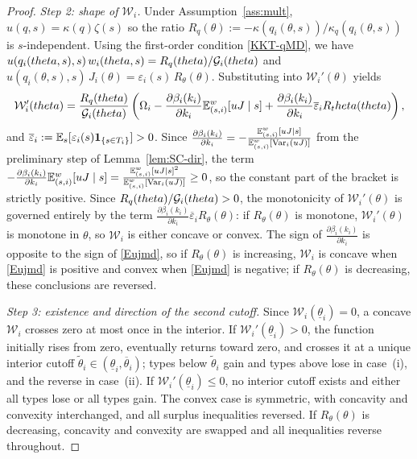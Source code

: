 \documentclass[master.tex]{subfiles}
\begin{document}
\begin{proof}
\noindent\textit{Step 2: shape of $\mathcal W_i$.} Under Assumption~\ref{ass:mult}, $u(q,s)=\kappa(q)\zeta(s)$ so the ratio $R_q(\theta) := -\kappa(q_i(\theta,s))/\kappa_q(q_i(\theta,s))$ is $s$-independent. Using the first-order condition \eqref{KKT-qMD}, we have $u(q_i(theta,s),s)\,w_i(theta,s) = R_q(theta)/\mathcal{G}_i(theta)$ and $u(q_i(\theta,s),s)\,J_i(\theta) = \varepsilon_i(s)\,R_\theta(\theta)$. Substituting into $\mathcal W_i'(\theta)$ yields
\[\mathcal W_i'(theta) = \frac{R_q(theta)}{\mathcal{G}_i(theta)}\left(\Omega_i - \frac{\partial \beta_i(k_i)}{\partial k_i}\mathbb{E}_{(s,i)}^w[uJ\mid s] + \frac{\partial \beta_i(k_i)}{\partial k_i} \overline \varepsilon_i R_theta(theta)\right),\]
and $ \overline \varepsilon_i := \mathbb{E}_s[\varepsilon_i(s)\mathbf 1_{\{s\in T_i\}}]>0$. Since $\frac{\partial \beta_i(k_i)}{\partial k_i} = -\frac{\mathbb{E}_{(s,i)}^w[uJ\mid s]}{\mathbb{E}_{(s,i)}^w[\mathrm{Var}_i(uJ)]}$ from the preliminary step of Lemma~\ref{lem:SC-dir}, the term $-\frac{\partial \beta_i(k_i)}{\partial k_i}\mathbb{E}_{(s,i)}^w[uJ\mid s] = \frac{\mathbb{E}_{(s,i)}^w[uJ\mid s]^2}{\mathbb{E}_{(s,i)}^w[\mathrm{Var}_i(uJ)]}\ge 0$, so the constant part of the bracket is strictly positive. Since $R_q(theta)/\mathcal{G}_i(theta)>0$, the monotonicity of $\mathcal W_i'(\theta)$ is governed entirely by the term $\frac{\partial \beta_i(k_i)}{\partial k_i} \overline \varepsilon_i R_\theta(\theta)$: if $R_\theta(\theta)$ is monotone, $\mathcal W_i'(\theta)$ is monotone in $\theta$, so $\mathcal W_i$ is either concave or convex. The sign of $\frac{\partial \beta_i(k_i)}{\partial k_i}$ is opposite to the sign of \eqref{Eujmd}, so if $R_\theta(\theta)$ is increasing, $\mathcal W_i$ is concave when \eqref{Eujmd} is positive and convex when \eqref{Eujmd} is negative; if $R_\theta(\theta)$ is decreasing, these conclusions are reversed.

\noindent\textit{Step 3: existence and direction of the second cutoff.} Since $\mathcal W_i(\underline\theta_i)=0$, a concave $\mathcal W_i$ crosses zero at most once in the interior. If $\mathcal W_i'(\underline\theta_i)>0$, the function initially rises from zero, eventually returns toward zero, and crosses it at a unique interior cutoff $\tilde\theta_i\in(\underline\theta_i,\overline\theta_i)$; types below $\tilde\theta_i$ gain and types above lose in case~(i), and the reverse in case~(ii). If $\mathcal W_i'(\underline\theta_i)\le 0$, no interior cutoff exists and either all types lose or all types gain. The convex case is symmetric, with concavity and convexity interchanged, and all surplus inequalities reversed. If $R_\theta(\theta)$ is decreasing, concavity and convexity are swapped and all inequalities reverse throughout.
\end{proof}
\end{document}
